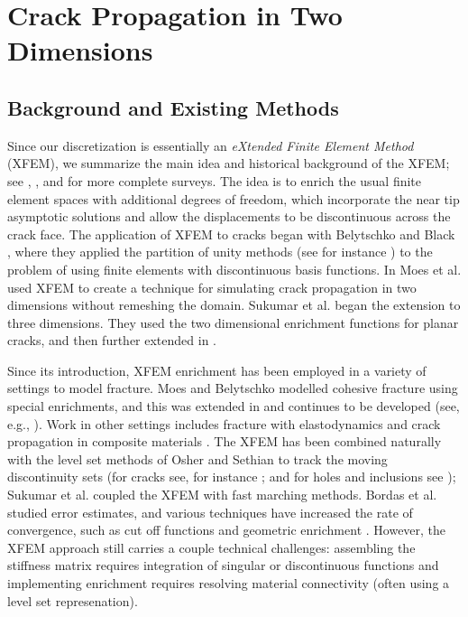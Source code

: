 %

\chapter{Crack Propagation in Two Dimensions} \label{ch:pt1.crackpropagation}

\section{Background and Existing Methods}

Since our discretization is essentially an \emph{eXtended Finite Element Method} (XFEM), we summarize the main idea and historical background of the XFEM; see \cite{Belytschko09}, \cite{Karihaloo03}, and \cite{Abdelaziz08} for more complete surveys. The idea is to enrich the usual finite element spaces with additional degrees of freedom, which incorporate the near tip asymptotic solutions and allow the displacements to be discontinuous across the crack face. The application of XFEM to cracks began with Belytschko and Black \cite{Belytschko99}, where they applied the partition of unity methods (see for instance \cite{Melenk96}) to the problem of using finite elements with discontinuous basis functions. In \cite{Moes99} Moes et al. used XFEM to create a technique for simulating crack propagation in two dimensions without remeshing the domain. Sukumar et al. \cite{Sukumar00} began the extension to three dimensions. They used the two dimensional enrichment functions for planar cracks, and then further extended in \cite{Areias05}.

Since its introduction, XFEM enrichment has been employed in a variety of settings to model fracture. Moes and Belytschko \cite{Moes02} modelled cohesive fracture using special enrichments, and this was extended in \cite{Zi.Goangseup03} and continues to be developed (see, e.g., \cite{Mariani03, Borst04, Asferg07}). Work in other settings includes fracture with elastodynamics \cite{Belytschko04} and crack propagation in composite materials \cite{Huynh09}. The XFEM has been combined naturally with the level set methods of Osher and Sethian \cite{Osher88, Osher04} to track the moving discontinuity sets (for cracks see, for instance \cite{Belytschko01, Moes02, Gravouil02, Duflot07, Prabel07}; and for holes and inclusions see \cite{Sukumar01}); Sukumar et al. \cite{Sukumar08} coupled the XFEM with fast marching methods. Bordas et al. \cite{Bordas07} studied error estimates, and various techniques have increased the rate of convergence, such as cut off functions and geometric enrichment \cite{Chahine06, Chahine08, Shen.Yongxing09}. However, the XFEM approach still carries a couple technical challenges: assembling the stiffness matrix requires integration of singular or discontinuous functions and implementing enrichment requires resolving material connectivity (often using a level set represenation).

